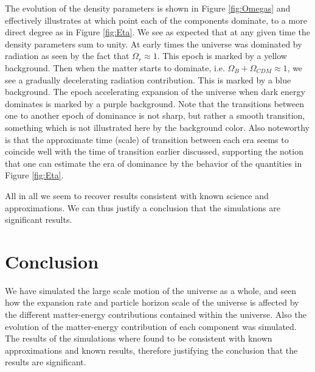 \documentclass[twocolumn]{aastex62}
\begin{document}
The evolution of the density parameters is shown in Figure \ref{fig:Omegas} and effectively
illustrates at which point each of the components dominate, to a more direct degree as in Figure \ref{fig:Eta}. 
We see as expected
that at any given time the density parameters sum to unity. At early times the
universe was dominated by radiation as seen by the fact that $\Omega_r \approx
1$. This epoch is marked by a yellow background. Then when the matter starts to
dominate, i.e. $\Omega_B + \Omega_{CDM} \approx 1$, we see a gradually
decelerating radiation contribution. This is marked by a blue background. The
epoch accelerating expansion of the universe when dark energy dominates is
marked by a purple background. Note that the transitions between one to another
epoch of dominance is not sharp, but rather a smooth transition, something
which is not illustrated here by the background color. Also noteworthy is that the approximate time
(scale) of transition between each era seems to coincide well with the time of
transition earlier discussed, supporting the notion that one can estimate the 
era of dominance by the behavior of the quantities in Figure \ref{fig:Eta}. 

All in all we seem to recover results consistent
with known science and approximations. We can thus justify a conclusion that the 
simulations are significant results.


\section{Conclusion} \label{sec:Conclusion}
We have simulated the large scale motion of the universe as a whole, and seen
how the expansion rate and particle horizon scale of the universe is affected by
the different matter-energy contributions contained within the universe. Also
the evolution of the matter-energy contribution of each component was simulated.
The results of the simulations where found to be consistent with known
approximations and known results, therefore justifying the conclusion that the
results are significant.




\end{document}
